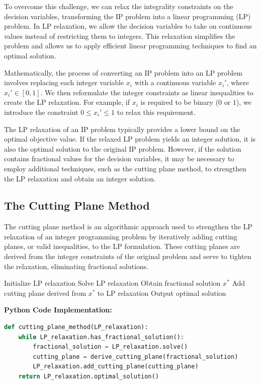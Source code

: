 \documentclass[12pt]{book} %
\begin{document}
To overcome this challenge, we can relax the integrality constraints on the decision variables, transforming the IP problem into a linear programming (LP) problem. In LP relaxation, we allow the decision variables to take on continuous values instead of restricting them to integers. This relaxation simplifies the problem and allows us to apply efficient linear programming techniques to find an optimal solution.

Mathematically, the process of converting an IP problem into an LP problem involves replacing each integer variable \(x_i\) with a continuous variable \(x_i'\), where \(x_i' \in [0, 1]\). We then reformulate the integer constraints as linear inequalities to create the LP relaxation. For example, if \(x_i\) is required to be binary (\(0\) or \(1\)), we introduce the constraint \(0 \leq x_i' \leq 1\) to relax this requirement.

The LP relaxation of an IP problem typically provides a lower bound on the optimal objective value. If the relaxed LP problem yields an integer solution, it is also the optimal solution to the original IP problem. However, if the solution contains fractional values for the decision variables, it may be necessary to employ additional techniques, such as the cutting plane method, to strengthen the LP relaxation and obtain an integer solution.

\subsection{The Cutting Plane Method}

The cutting plane method is an algorithmic approach used to strengthen the LP relaxation of an integer programming problem by iteratively adding cutting planes, or valid inequalities, to the LP formulation. These cutting planes are derived from the integer constraints of the original problem and serve to tighten the relaxation, eliminating fractional solutions.

\begin{algorithm}
\caption{Cutting Plane Method}
\begin{algorithmic}[1]
\State Initialize LP relaxation
    \State Solve LP relaxation
    \State Obtain fractional solution \(x^*\)
    \State Add cutting plane derived from \(x^*\) to LP relaxation
\EndWhile
\State Output optimal solution
\end{algorithmic}
\end{algorithm}
\FloatBarrier
\textbf{Python Code Implementation:}
\FloatBarrier
\begin{lstlisting}[language=Python, caption=Python implementation of the Cutting Plane Method]
def cutting_plane_method(LP_relaxation):
    while LP_relaxation.has_fractional_solution():
        fractional_solution = LP_relaxation.solve()
        cutting_plane = derive_cutting_plane(fractional_solution)
        LP_relaxation.add_cutting_plane(cutting_plane)
    return LP_relaxation.optimal_solution()
\end{lstlisting}
\FloatBarrier
\end{document}
